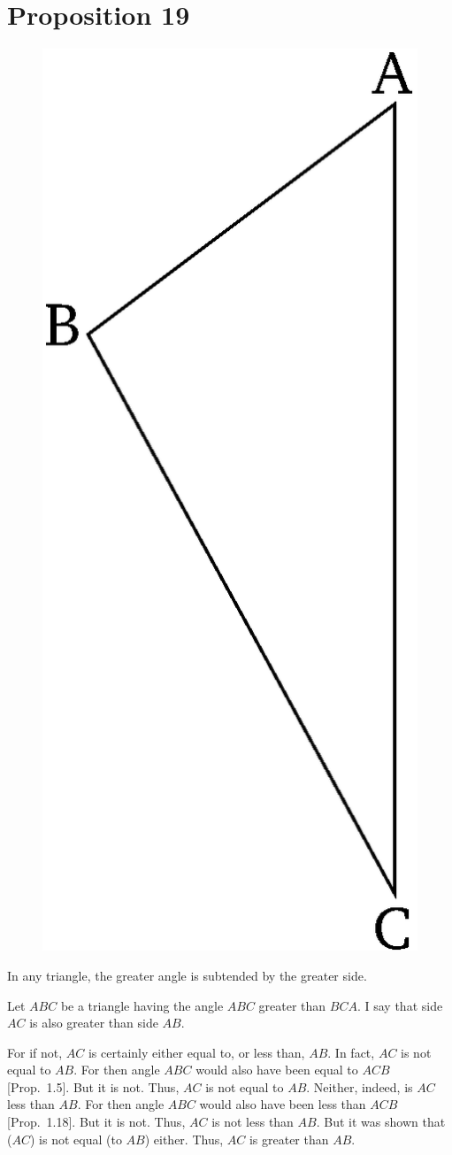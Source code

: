 \chapter*{Proposition 19}
\label{prop:19}

\begin{figure}[ht]
    \begin{center}
    \includegraphics[width=0.5\linewidth]{figures/fig19e.eps}
    \label{fig:prop_19}
    \end{center}
\end{figure}

In any triangle, the greater angle is subtended by the greater side.

Let $ABC$ be a triangle having the angle $ABC$ greater than $BCA$. I say
that side $AC$ is also greater than side $AB$.

For if not, $AC$ is certainly either equal to, or less than, $AB$. In fact, $AC$ is not
equal to $AB$. For then angle $ABC$  would also have been equal to $ACB$ [Prop.~1.5].
But it is not. Thus, $AC$ is not equal to $AB$.
Neither, indeed, is $AC$ less than $AB$. For then angle $ABC$ would also have been
less than $ACB$ [Prop.~1.18]. But it is not. Thus, $AC$ is not less than
$AB$. But it was  shown that ($AC$) is    not equal (to $AB$) either. Thus, $AC$ 
is greater than $AB$.

